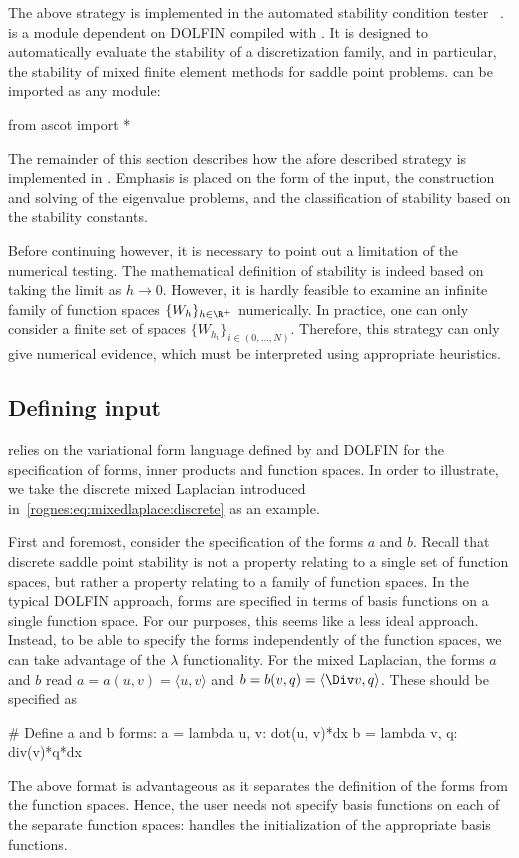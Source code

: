 The above strategy is implemented in the automated stability condition
tester \rognesascot{}~\citep{Rognes2009}. \rognesascot{} is a
\rognespython{} module dependent on DOLFIN compiled with
\slepc{}. It is designed to automatically evaluate the stability of a
discretization family, and in particular, the stability of mixed
finite element methods for saddle point problems. \rognesascot{} can
be imported as any \rognespython{} module:
\begin{python}
  from ascot import *
\end{python}
The remainder of this section describes how the afore described
strategy is implemented in \rognesascot{}. Emphasis is placed on the
form of the input, the construction and solving of the eigenvalue
problems, and the classification of stability based on the stability
constants.

Before continuing however, it is necessary to point out a limitation
of the numerical testing. The mathematical definition of stability is
indeed based on taking the limit as $h \rightarrow 0$. However, it is
hardly feasible to examine an infinite family of function spaces
$\{W_h\}_{h \in \R^{+}}$ numerically. In practice, one can only
consider a finite set of spaces $\{W_{h_i}\}_{i \in (0, \dots,
N)}$. Therefore, this strategy can only give numerical evidence, which
must be interpreted using appropriate heuristics.

\subsection{Defining input}
\label{rognes:subsec:input}

\rognesascot{} relies on the variational form language defined by \ufl{} and
DOLFIN for the specification of forms, inner products and function
spaces.  In order to illustrate, we take the discrete mixed Laplacian
introduced in~\eqref{rognes:eq:mixedlaplace:discrete} as an example.

First and foremost, consider the specification of the forms $a$ and
$b$. Recall that discrete saddle point stability is not a property
relating to a single set of function spaces, but rather a property
relating to a family of function spaces. In the typical DOLFIN
approach, forms are specified in terms of basis functions on a single
function space. For our purposes, this seems like a less ideal
approach. Instead, to be able to specify the forms independently of
the function spaces, we can take advantage of the \rognespython{}
$\lambda$ functionality. For the mixed Laplacian, the forms $a$ and
$b$ read $a = a(u, v) = \langle u, v \rangle$ and $b = b(v, q) =
\langle \Div v, q \rangle$. These should be specified as
\begin{python}
  # Define a and b forms:
  a = lambda u, v: dot(u, v)*dx
  b = lambda v, q: div(v)*q*dx
\end{python}
The above format is advantageous as it separates the definition of the
forms from the function spaces. Hence, the user needs not specify
basis functions on each of the separate function
spaces: \rognesascot{} handles the initialization of the appropriate
basis functions.

